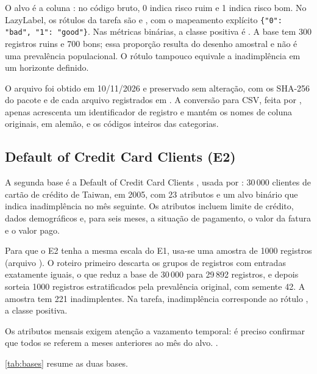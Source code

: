 O alvo é a coluna : no código bruto, 0 indica risco ruim e 1 indica risco bom. No LazyLabel, os rótulos da tarefa são  e , com o mapeamento explícito \texttt{\{"0": "bad", "1": "good"\}}. Nas métricas binárias, a classe positiva é . A base tem 300 registros ruins e 700 bons; essa proporção resulta do desenho amostral e não é uma prevalência populacional. O rótulo tampouco equivale a inadimplência em um horizonte definido.

O arquivo foi obtido em 10/11/2026 e preservado sem alteração, com os SHA-256 do pacote e de cada arquivo registrados em . A conversão para CSV, feita por , apenas acrescenta um identificador de registro e mantém os nomes de coluna originais, em alemão, e os códigos inteiros das categorias.

\subsection{Default of Credit Card Clients (E2)}

A segunda base é a Default of Credit Card Clients \cite{uci350}, usada por : 30\,000 clientes de cartão de crédito de Taiwan, em 2005, com 23 atributos e um alvo binário que indica inadimplência no mês seguinte. Os atributos incluem limite de crédito, dados demográficos e, para seis meses, a situação de pagamento, o valor da fatura e o valor pago.

Para que o E2 tenha a mesma escala do E1, usa-se uma amostra de 1000 registros (arquivo ). O roteiro  primeiro descarta os grupos de registros com entradas exatamente iguais, o que reduz a base de 30\,000 para 29\,892 registros, e depois sorteia 1000 registros estratificados pela prevalência original, com semente 42. A amostra tem 221 inadimplentes. Na tarefa, inadimplência corresponde ao rótulo , a classe positiva.

Os atributos mensais exigem atenção a vazamento temporal: é preciso confirmar que todos se referem a meses anteriores ao mês do alvo. .

\autoref{tab:bases} resume as duas bases.

